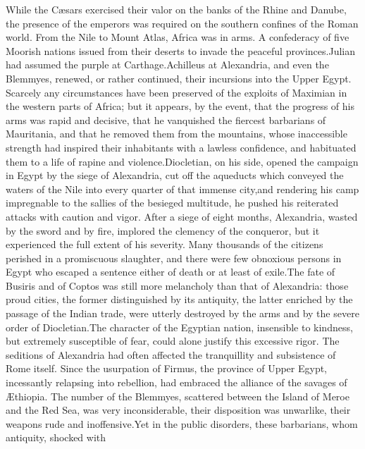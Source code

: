 While the Cæsars exercised their valor on the banks of the Rhine
and Danube, the presence of the emperors was required on the
southern confines of the Roman world. From the Nile to Mount
Atlas, Africa was in arms. A confederacy of five Moorish nations
issued from their deserts to invade the peaceful provinces.\footnotemark[40]
Julian had assumed the purple at Carthage.\footnotemark[41] Achilleus at
Alexandria, and even the Blemmyes, renewed, or rather continued,
their incursions into the Upper Egypt. Scarcely any circumstances
have been preserved of the exploits of Maximian in the western
parts of Africa; but it appears, by the event, that the progress
of his arms was rapid and decisive, that he vanquished the
fiercest barbarians of Mauritania, and that he removed them from
the mountains, whose inaccessible strength had inspired their
inhabitants with a lawless confidence, and habituated them to a
life of rapine and violence.\footnotemark[42] Diocletian, on his side, opened
the campaign in Egypt by the siege of Alexandria, cut off the
aqueducts which conveyed the waters of the Nile into every
quarter of that immense city,\footnotemark[43] and rendering his camp
impregnable to the sallies of the besieged multitude, he pushed
his reiterated attacks with caution and vigor. After a siege of
eight months, Alexandria, wasted by the sword and by fire,
implored the clemency of the conqueror, but it experienced the
full extent of his severity. Many thousands of the citizens
perished in a promiscuous slaughter, and there were few obnoxious
persons in Egypt who escaped a sentence either of death or at
least of exile.\footnotemark[44] The fate of Busiris and of Coptos was still
more melancholy than that of Alexandria: those proud cities, the
former distinguished by its antiquity, the latter enriched by the
passage of the Indian trade, were utterly destroyed by the arms
and by the severe order of Diocletian.\footnotemark[45] The character of the
Egyptian nation, insensible to kindness, but extremely
susceptible of fear, could alone justify this excessive rigor.
The seditions of Alexandria had often affected the tranquillity
and subsistence of Rome itself. Since the usurpation of Firmus,
the province of Upper Egypt, incessantly relapsing into
rebellion, had embraced the alliance of the savages of Æthiopia.
The number of the Blemmyes, scattered between the Island of Meroe
and the Red Sea, was very inconsiderable, their disposition was
unwarlike, their weapons rude and inoffensive.\footnotemark[46] Yet in the
public disorders, these barbarians, whom antiquity, shocked with
